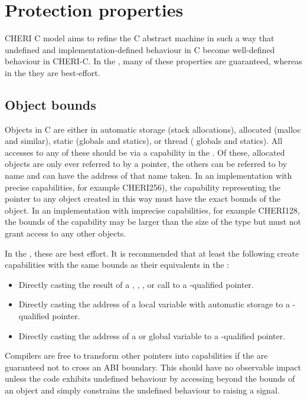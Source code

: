 \section{Protection properties}

CHERI C model aims to refine the C abstract machine in such a way that undefined and implementation-defined behaviour in C become well-defined behaviour in CHERI-C.
In the \sandboxABI{}, many of these properties are guaranteed, whereas in the \hybridABI{} they are best-effort.

\subsection{Object bounds}

Objects in C are either in automatic storage (stack allocations), allocated (malloc and similar), static (globals and statics), or thread ( globals and statics).
All accesses to any of these should be via a capability in the \sandboxABI{}.
Of these, allocated objects are only ever referred to by a pointer, the others can be referred to by name and can have the address of that name taken.
In an implementation with precise capabilities, for example CHERI256), the capability representing the pointer to any object created in this way must have the exact bounds of the object.
In an implementation with imprecise capabilities, for example CHERI128, the bounds of the capability may be larger than the size of the type but must not grant access to any other objects.

In the \hybridABI{}, these are best effort.
It is recommended that at least the following create capabilities with the same bounds as their equivalents in the \sandboxABI{}:
\begin{itemize}
	\item Directly casting the result of a , , , or  call to a -qualified pointer.
	\item Directly casting the address of a local variable with automatic storage to a -qualified pointer.
	\item Directly casting the address of a  or global variable to a -qualified pointer.
\end{itemize}

Compilers are free to transform other pointers into capabilities if the are guaranteed not to cross an ABI boundary.
This should have no observable impact unless the code exhibits undefined behaviour by accessing beyond the bounds of an object and simply constrains the undefined behaviour to raising a signal.

